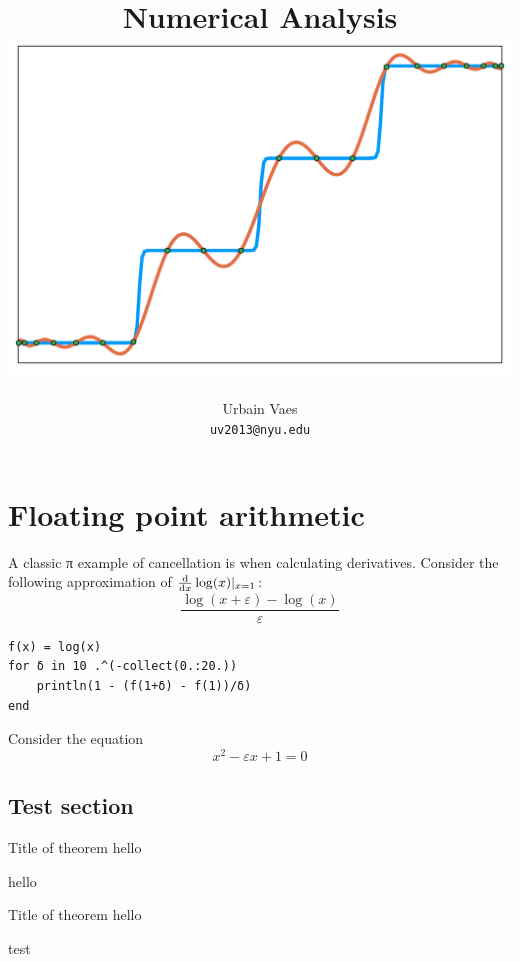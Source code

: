 \documentclass[11pt,a4paper]{report}
\title{\vspace{-1cm}\textbf{Numerical Analysis} \\[1cm]
    \includegraphics[width=.7\textwidth]{figures/chebychev_cover.pdf}
}
\author{%
    Urbain Vaes \\
    \texttt{uv2013@nyu.edu}
}
\date{\vspace{1cm} {\large\textsc{NYU Paris}, Spring term 2022} \\[2cm]
    \vfill
    \flushleft \textbf{Weekly schedule}:
    \begin{itemize}
        \item Lectures on Tuesday and Thursday afternoon (2 x 1h15);
        \item Recitation on Thursday afternoon (1h30);
        \item Office hour on Tuesday, after the lecture.
    \end{itemize}
}
\begin{document}
\maketitle



\tableofcontents

\chapter{Floating point arithmetic}%
\label{cha:rounding_errors}

\begin{example}
\end{example}

\begin{example}
    A classic π example of cancellation is when calculating derivatives.
    Consider the following approximation of $\frac{\mathrm d}{\mathrm d x}\log(x) \vert_{x=1}$:
    \[
        	\frac{\log(x + \varepsilon) - \log(x)}{\varepsilon}
    \]
\begin{verbatim}
f(x) = log(x)
for δ in 10 .^(-collect(0.:20.))
    println(1 - (f(1+δ) - f(1))/δ)
end
\end{verbatim}
\end{example}

\begin{example}
    Consider the equation
    \[
        x^2 - \varepsilon x + 1 = 0
    \]
\end{example}

\section{Test section}%
\label{sec:test_section}

\begin{theorem}
    {Title of theorem}
    \label{thm:test}
    hello
\end{theorem}

\begin{example}
    hello
\end{example}

\begin{lemma}
    {Title of theorem}
    \label{lemma:test}
    hello
\end{lemma}

\begin{remark}
    [Hello]
    test
\end{remark}
\end{document}

